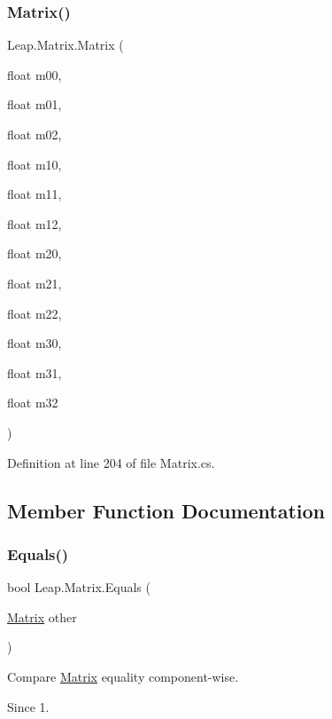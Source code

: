 \subsubsection{\texorpdfstring{Matrix()}{Matrix()}\hspace{0.1cm}{\footnotesize\ttfamily [7/7]}}
{\footnotesize\ttfamily Leap.\+Matrix.\+Matrix (\begin{DoxyParamCaption}\item[{float}]{m00,  }\item[{float}]{m01,  }\item[{float}]{m02,  }\item[{float}]{m10,  }\item[{float}]{m11,  }\item[{float}]{m12,  }\item[{float}]{m20,  }\item[{float}]{m21,  }\item[{float}]{m22,  }\item[{float}]{m30,  }\item[{float}]{m31,  }\item[{float}]{m32 }\end{DoxyParamCaption})}



Definition at line 204 of file Matrix.\+cs.



\subsection{Member Function Documentation}
\mbox{\label{struct_leap_1_1_matrix_a304a036cbf1b9389e6566ae2820337b9}} 
\subsubsection{\texorpdfstring{Equals()}{Equals()}}
{\footnotesize\ttfamily bool Leap.\+Matrix.\+Equals (\begin{DoxyParamCaption}\item[{\mbox{\hyperlink{struct_leap_1_1_matrix}{Matrix}}}]{other }\end{DoxyParamCaption})}



Compare \mbox{\hyperlink{struct_leap_1_1_matrix}{Matrix}} equality component-\/wise. 

\begin{DoxySince}{Since}
1. 
\end{DoxySince}


